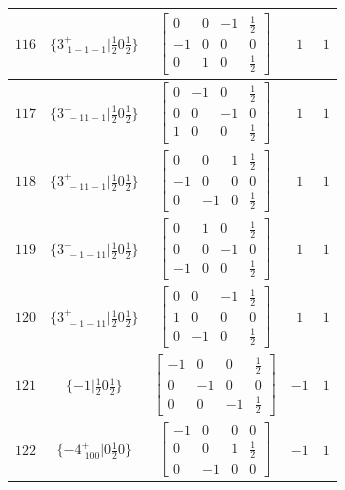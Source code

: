 \documentclass[fleqn,8pt]{jsarticle}
\begin{document}
\begin{longtable}{ccccc}
$ 116 $ & $ \{3^{+}_{\,\,1-1-1}|\frac{1}{2} 0 \frac{1}{2}\} $ & $ \begin{bmatrix} 0 & 0 & -1 & \frac{1}{2} \\ -1 & 0 & 0 & 0 \\ 0 & 1 & 0 & \frac{1}{2} \end{bmatrix} $ & $ 1 $ & $ 1 $ \\ \hline
$ 117 $ & $ \{3^{-}_{\,\,-11-1}|\frac{1}{2} 0 \frac{1}{2}\} $ & $ \begin{bmatrix} 0 & -1 & 0 & \frac{1}{2} \\ 0 & 0 & -1 & 0 \\ 1 & 0 & 0 & \frac{1}{2} \end{bmatrix} $ & $ 1 $ & $ 1 $ \\ \hline
$ 118 $ & $ \{3^{+}_{\,\,-11-1}|\frac{1}{2} 0 \frac{1}{2}\} $ & $ \begin{bmatrix} 0 & 0 & 1 & \frac{1}{2} \\ -1 & 0 & 0 & 0 \\ 0 & -1 & 0 & \frac{1}{2} \end{bmatrix} $ & $ 1 $ & $ 1 $ \\ \hline
$ 119 $ & $ \{3^{-}_{\,\,-1-11}|\frac{1}{2} 0 \frac{1}{2}\} $ & $ \begin{bmatrix} 0 & 1 & 0 & \frac{1}{2} \\ 0 & 0 & -1 & 0 \\ -1 & 0 & 0 & \frac{1}{2} \end{bmatrix} $ & $ 1 $ & $ 1 $ \\ \hline
$ 120 $ & $ \{3^{+}_{\,\,-1-11}|\frac{1}{2} 0 \frac{1}{2}\} $ & $ \begin{bmatrix} 0 & 0 & -1 & \frac{1}{2} \\ 1 & 0 & 0 & 0 \\ 0 & -1 & 0 & \frac{1}{2} \end{bmatrix} $ & $ 1 $ & $ 1 $ \\ \hline
$ 121 $ & $ \{-1|\frac{1}{2} 0 \frac{1}{2}\} $ & $ \begin{bmatrix} -1 & 0 & 0 & \frac{1}{2} \\ 0 & -1 & 0 & 0 \\ 0 & 0 & -1 & \frac{1}{2} \end{bmatrix} $ & $ -1 $ & $ 1 $ \\ \hline
$ 122 $ & $ \{-4^{+}_{\,\,100}|0 \frac{1}{2} 0\} $ & $ \begin{bmatrix} -1 & 0 & 0 & 0 \\ 0 & 0 & 1 & \frac{1}{2} \\ 0 & -1 & 0 & 0 \end{bmatrix} $ & $ -1 $ & $ 1 $ \\ \hline

\end{longtable}
\end{document}
